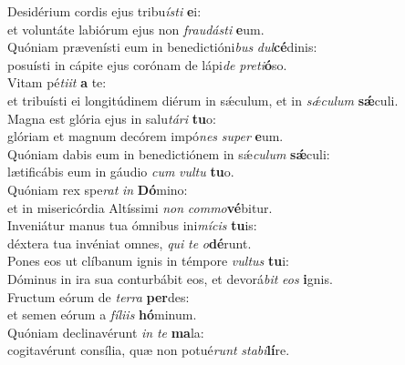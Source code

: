 \evenverse Desidérium cordis ejus tribu\textit{í}\textit{sti} \textbf{e}i:~\*\\
\evenverse et voluntáte labiórum ejus non \textit{frau}\textit{dá}\textit{sti} \textbf{e}um.\\
\oddverse Quóniam prævenísti eum in benedictióni\textit{bus} \textit{dul}\textbf{cé}dinis:~\*\\
\oddverse posuísti in cápite ejus corónam de lápi\textit{de} \textit{pre}\textit{ti}\textbf{ó}so.\\
\evenverse Vitam pé\textit{ti}\textit{it} \textbf{a} te:~\*\\
\evenverse et tribuísti ei longitúdinem diérum in sǽculum, et in \textit{sǽ}\textit{cu}\textit{lum} \textbf{sǽ}culi.\\
\oddverse Magna est glória ejus in salu\textit{tá}\textit{ri} \textbf{tu}o:~\*\\
\oddverse glóriam et magnum decórem impó\textit{nes} \textit{su}\textit{per} \textbf{e}um.\\
\evenverse Quóniam dabis eum in benedictiónem in sǽ\textit{cu}\textit{lum} \textbf{sǽ}culi:~\*\\
\evenverse lætificábis eum in gáudio \textit{cum} \textit{vul}\textit{tu} \textbf{tu}o.\\
\oddverse Quóniam rex spe\textit{rat} \textit{in} \textbf{Dó}mino:~\*\\
\oddverse et in misericórdia Altíssimi \textit{non} \textit{com}\textit{mo}\textbf{vé}bitur.\\
\evenverse Inveniátur manus tua ómnibus ini\textit{mí}\textit{cis} \textbf{tu}is:~\*\\
\evenverse déxtera tua invéniat omnes, \textit{qui} \textit{te} \textit{o}\textbf{dé}runt.\\
\oddverse Pones eos ut clíbanum ignis in témpore \textit{vul}\textit{tus} \textbf{tu}i:~\*\\
\oddverse Dóminus in ira sua conturbábit eos, et devorá\textit{bit} \textit{e}\textit{os} \textbf{i}gnis.\\
\evenverse Fructum eórum de \textit{ter}\textit{ra} \textbf{per}des:~\*\\
\evenverse et semen eórum a \textit{fí}\textit{li}\textit{is} \textbf{hó}minum.\\
\oddverse Quóniam declinavérunt \textit{in} \textit{te} \textbf{ma}la:~\*\\
\oddverse cogitavérunt consília, quæ non potué\textit{runt} \textit{sta}\textit{bi}\textbf{lí}re.\\
